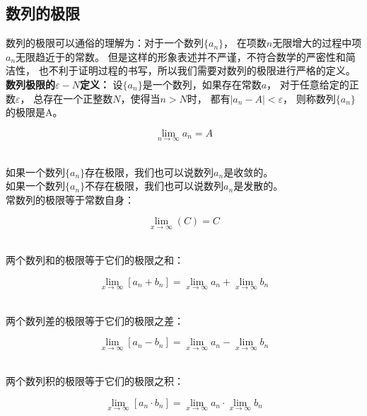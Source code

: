 \documentclass[UTF8]{ctexart}
\begin{document}
\subsection{数列的极限}
    数列的极限可以通俗的理解为：对于一个数列$\{a_n\}$，
    在项数$n$无限增大的过程中项$a_{n}$无限趋近于的常数。
    但是这样的形象表述并不严谨，不符合数学的严密性和简洁性，
    也不利于证明过程的书写，所以我们需要对数列的极限进行严格的定义。\\[3mm]
    \textbf{数列极限的$\varepsilon-N$定义：}
    设$\{a_n\}$是一个数列，如果存在常数$a$，
    对于任意给定的正数$\varepsilon$，
    总存在一个正整数$N$，使得当$n>N$时，
    都有$\left|a_n-A\right|<\varepsilon$，
    则称数列$\{a_n\}$的极限是A。
    \begin{large}
        \begin{equation*}
            \lim_{n\to\infty}a_n=A
        \end{equation*}
    \end{large}\\
    如果一个数列$\{a_n\}$存在极限，我们也可以说数列${a_n}$是收敛的。\\[2mm]
    如果一个数列$\{a_n\}$不存在极限，我们也可以说数列${a_n}$是发散的。\\[5mm]
    常数列的极限等于常数自身：
    \begin{large}
        \begin{equation*}
            \lim_{x\to\infty}(C)=C
        \end{equation*}
    \end{large}\\
    两个数列和的极限等于它们的极限之和：
    \begin{large}
        \begin{equation*}
            \lim_{x\to\infty}[a_{n}+b_{n}]=\lim_{x\to\infty}a_{n}+\lim_{x\to\infty}b_{n}
        \end{equation*}
    \end{large}\\
    两个数列差的极限等于它们的极限之差：
    \begin{large}
        \begin{equation*}
            \lim_{x\to\infty}[a_{n}-b_{n}]=\lim_{x\to\infty}a_{n}-\lim_{x\to\infty}b_{n}
        \end{equation*}
    \end{large}\\
    两个数列积的极限等于它们的极限之积：
    \begin{large}
        \begin{equation*}
            \lim_{x\to\infty}[a_{n}\cdot b_{n}]=\lim_{x\to\infty}a_{n}\cdot\lim_{x\to\infty}b_{n}
        \end{equation*}
    \end{large}\\
\end{document}

